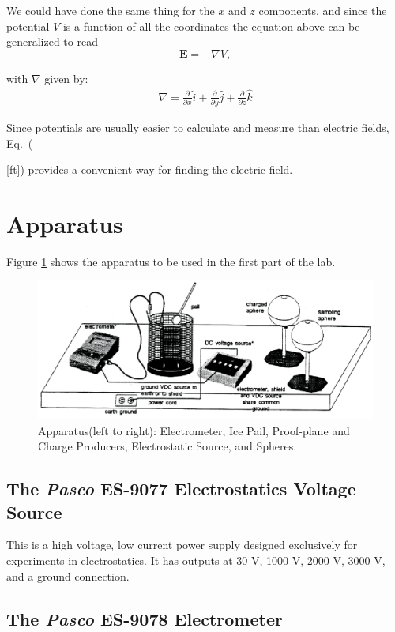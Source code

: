 {We could have done the same thing for the $x$ and $z$ components,
and since the potential $V$ is a function of all the coordinates
the equation above can be generalized to read
\begin{equation}
{\mathbf{E}}=-\nabla V,
 \label{ft}
\end{equation}

with $\nabla$ given by:
\begin{eqnarray*}
\nabla=\frac{\partial}{\partial x}\hat{i}+\frac{\partial}{\partial
y}\hat{j}+\frac{\partial}{\partial z}\hat{k}
\end{eqnarray*}

Since potentials are usually easier to calculate and measure than
electric fields, Eq.~({\ref{ft}) provides a convenient way for
finding the electric field.



\section{Apparatus}
Figure \ref{es5} shows the apparatus to be used in the first part
of the lab.

\begin{figure}[!htb]
\centering
\epsfxsize=16cm \includegraphics[scale=0.6]{1_electro/Electrostatics.eps}
\caption{Apparatus(left to right): Electrometer, Ice
Pail, Proof-plane and Charge Producers, Electrostatic Source, and
Spheres.}
 \label{es5}
\end{figure}

\subsection{The {\it Pasco} ES-9077 Electrostatics Voltage Source}
This is a high voltage, low current power supply designed
exclusively for experiments in electrostatics.  It has outputs at
30 V, 1000 V, 2000 V, 3000 V, and a ground connection.


\subsection{The {\it Pasco} ES-9078 Electrometer}

}}
